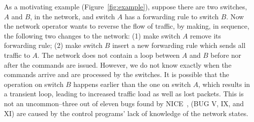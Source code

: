 

As a motivating example (Figure~\ref{fig:example}), suppose there are two
switches, $A$ and $B$, in the network, and switch $A$ has a forwarding rule
 to switch $B$. 
Now the
network operator wants to reverse the flow of traffic, by making, in sequence,
the following two changes to the network: (1) make switch $A$ remove its
forwarding rule; (2) make switch $B$ insert a new forwarding rule which sends
all traffic to $A$. The network does not contain a loop between $A$ and $B$
before nor after the commands are issued.
However, we do not know exactly when the commands arrive and are processed by
the switches. It is possible that the operation on switch $B$
happens earlier than the one on switch $A$, which results in a transient
loop, leading to increased traffic load as well as lost packets.
This is not an uncommon--three out of eleven bugs found by NICE~\cite{Nice2012}, 
(BUG V, IX, and XI) are caused by the control programs' lack of knowledge of the network states.

